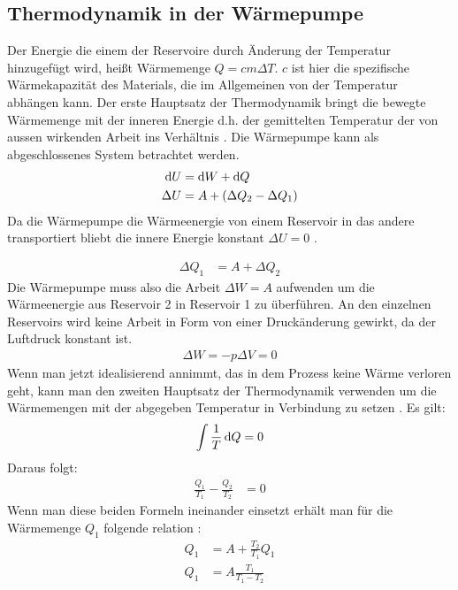 \subsection{Thermodynamik in der Wärmepumpe}

Der Energie die einem der Reservoire durch Änderung der Temperatur hinzugefügt wird,
heißt Wärmemenge $ Q = c m \Delta T $. 
$ c $ ist hier die spezifische Wärmekapazität des Materials, die im Allgemeinen von der Temperatur abhängen kann.
Der erste Hauptsatz der Thermodynamik bringt die bewegte Wärmemenge mit der inneren Energie d.h. der gemittelten Temperatur
der von aussen wirkenden Arbeit ins Verhältnis \cite[vgl][318]{demtroeder}. 
Die Wärmepumpe kann als abgeschlossenes System betrachtet werden. 
\begin{align}
                \mathop{}\!\mathrm{d} U &= \mathop{}\!\mathrm{d} W + \mathop{}\!\mathrm{d} Q \\
    \nonumber   \Delta U &= A + (\Delta Q_{2} - \Delta Q_{1}) \\
\end{align}
Da die Wärmepumpe die Wärmeenergie von einem Reservoir in das andere transportiert
    bliebt die innere Energie konstant $ \Delta U = 0 $ .

\begin{align}
                \Delta Q_{1}    &= A + \Delta Q_{2} %
\end{align}
%
Die Wärmepumpe muss also die Arbeit $\Delta W = A$ aufwenden um die Wärmeenergie aus Reservoir 2 in Reservoir 1 zu überführen.
An den einzelnen Reservoirs wird keine Arbeit in Form von einer Druckänderung gewirkt, da der Luftdruck konstant ist.
\begin{align}
    \Delta W = - p \Delta V = 0 
\end{align}
Wenn man jetzt idealisierend annimmt, das in dem Prozess keine Wärme verloren geht, kann man den zweiten Hauptsatz der Thermodynamik
verwenden um die Wärmemengen mit der abgegeben Temperatur in Verbindung zu setzen \cite[vgl.][1]{man:v206}. 
Es gilt:
\begin{align}
    \int \frac{1}{T} \diff Q = 0 %
\end{align}
Daraus folgt:
\begin{align}
    \frac{Q_{1}}{T_{1}} - \frac{Q_{2}}{T_{2}} &= 0
\end{align}
Wenn man diese beiden Formeln ineinander einsetzt erhält man für die Wärmemenge $Q_1$ folgende relation \cite{man:v206}: 
\begin{align}
    Q_1 &= A + \frac{T_2}{T_1}Q_1 \\
    Q_1 &= A \frac{T_1}{T_1 - T_2}
\end{align}